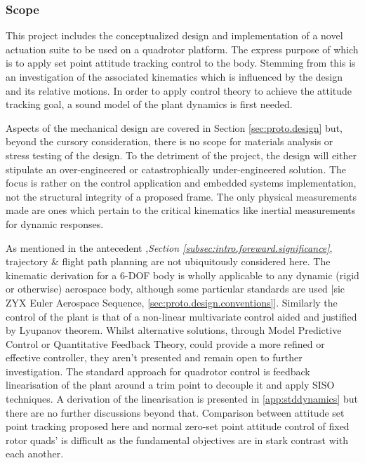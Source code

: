 \subsubsection{Scope}
\label{subsubsec:intro.foreward.scope}
This project includes the conceptualized design and implementation of a novel actuation suite to be used on a quadrotor platform. The express purpose of which is to apply set point attitude tracking control to the body. Stemming from this is an investigation of the associated kinematics which is influenced by the design and its relative motions. In order to apply control theory to achieve the attitude tracking goal, a sound model of the plant dynamics is first needed.
\par
Aspects of the mechanical design are covered in Section \ref{sec:proto.design} but, beyond the cursory consideration, there is no scope for materials analysis or stress testing of the design. To the detriment of the project, the design will either stipulate an over-engineered or catastrophically under-engineered solution. The focus is rather on the control application and embedded systems implementation, not the structural integrity of a proposed frame. The only physical measurements made are ones which pertain to the critical kinematics like inertial measurements for dynamic responses.
\par
As mentioned in the antecedent ,\emph{Section \ref{subsec:intro.foreward.significance}}, trajectory \& flight path planning are not ubiquitously considered here. The kinematic derivation for a 6-DOF body is wholly applicable to any dynamic (rigid or otherwise) aerospace body, although some particular standards are used [sic ZYX Euler Aerospace Sequence, \ref{sec:proto.design.conventions}]. Similarly the control of the plant is that of a non-linear multivariate control aided and justified by Lyupanov theorem. Whilst alternative solutions, through Model Predictive Control or Quantitative Feedback Theory, could provide a more refined or effective controller, they aren't presented and remain open to further investigation. The standard approach for quadrotor control is feedback linearisation of the plant around a trim point to decouple it and apply SISO techniques. A derivation of the linearisation is presented in \ref{app:stddynamics} but there are no further discussions beyond that. Comparison between attitude set point tracking proposed here and normal zero-set point attitude control of fixed rotor quads' is difficult as the fundamental objectives are in stark contrast with each another.
